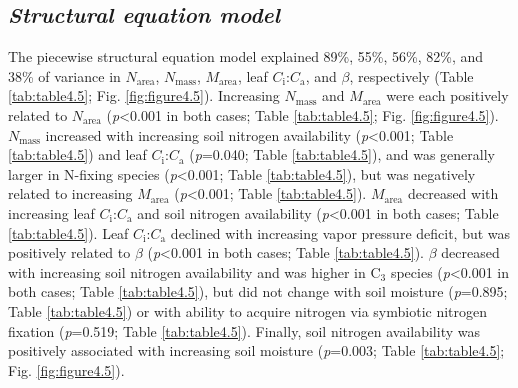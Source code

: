 \subsection{\textit{Structural equation model}}
\noindent The piecewise structural equation model explained 89\%, 55\%, 56\%, 82\%, and 38\% of variance in $N_\mathrm{area}$, $N_\mathrm{mass}$, $M_\mathrm{area}$, leaf $C_\mathrm{i}$:$C_\mathrm{a}$, and $\beta$, respectively (Table \ref{tab:table4.5}; Fig. \ref{fig:figure4.5}). Increasing $N_\mathrm{mass}$ and $M_\mathrm{area}$ were each positively related to $N_\mathrm{area}$ (\textit{p}<0.001 in both cases; Table \ref{tab:table4.5}; Fig. \ref{fig:figure4.5}). $N_\mathrm{mass}$ increased with increasing soil nitrogen availability (\textit{p}<0.001; Table \ref{tab:table4.5}) and leaf $C_\mathrm{i}$:$C_\mathrm{a}$ (\textit{p}=0.040; Table \ref{tab:table4.5}), and was generally larger in N-fixing species (\textit{p}<0.001; Table \ref{tab:table4.5}), but was negatively related to increasing $M_\mathrm{area}$ (\textit{p}<0.001; Table \ref{tab:table4.5}). $M_\mathrm{area}$ decreased with increasing leaf $C_\mathrm{i}$:$C_\mathrm{a}$ and soil nitrogen availability (\textit{p}<0.001 in both cases; Table \ref{tab:table4.5}). Leaf $C_\mathrm{i}$:$C_\mathrm{a}$ declined with increasing vapor pressure deficit, but was positively related to $\beta$ (\textit{p}<0.001 in both cases; Table \ref{tab:table4.5}). $\beta$ decreased with increasing soil nitrogen availability and was higher in C$_3$ species (\textit{p}<0.001 in both cases; Table \ref{tab:table4.5}), but did not change with soil moisture (\textit{p}=0.895; Table \ref{tab:table4.5}) or with ability to acquire nitrogen via symbiotic nitrogen fixation (\textit{p}=0.519; Table \ref{tab:table4.5}). Finally, soil nitrogen availability was positively associated with increasing soil moisture (\textit{p}=0.003; Table \ref{tab:table4.5}; Fig. \ref{fig:figure4.5}).

